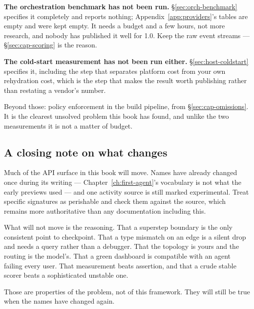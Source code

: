\textbf{The orchestration benchmark has not been run.}
\S\ref{sec:orch-benchmark} specifies it completely and reports nothing;
Appendix~\ref{app:providers}'s tables are empty and were kept empty. It needs a
budget and a few hours, not more research, and nobody has published it well for
1.0. Keep the raw event streams --- \S\ref{sec:cap-scoring} is the reason.

\textbf{The cold-start measurement has not been run either.}
\S\ref{sec:host-coldstart} specifies it, including the step that separates
platform cost from your own rehydration cost, which is the step that makes the
result worth publishing rather than restating a vendor's number.

Beyond those: policy enforcement in the build pipeline, from
\S\ref{sec:cap-omissions}. It is the clearest unsolved problem this book has
found, and unlike the two measurements it is not a matter of budget.

\subsection{A closing note on what changes}

Much of the API surface in this book will move. Names have already changed once
during its writing --- Chapter~\ref{ch:first-agent}'s vocabulary is not what the
early previews used --- and one activity source is still marked experimental.
Treat specific signatures as perishable and check them against the source, which
remains more authoritative than any documentation including this.

What will not move is the reasoning. That a superstep boundary is the only
consistent point to checkpoint. That a type mismatch on an edge is a silent drop
and needs a query rather than a debugger. That the topology is yours and the
routing is the model's. That a green dashboard is compatible with an agent
failing every user. That measurement beats assertion, and that a crude stable
scorer beats a sophisticated unstable one.

Those are properties of the problem, not of this framework. They will still be
true when the names have changed again.

